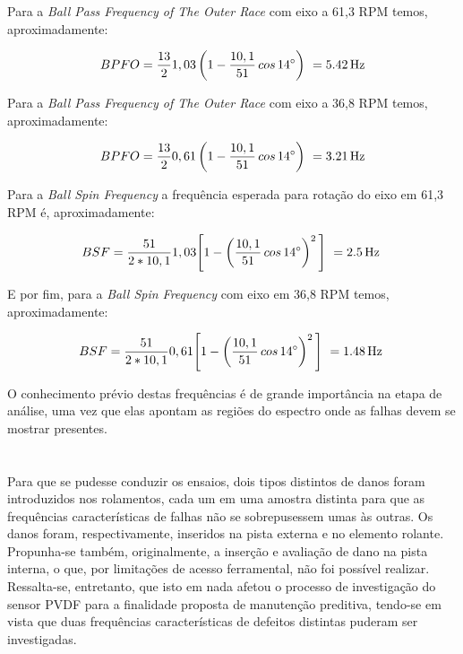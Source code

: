 \documentclass[
	12pt,				
	oneside,			
	a4paper,			
	english,			
	brazil,	
	sumario=abnt-6027-2012		
	]{abntex2ppgsi}
\begin{document}
Para a \textit{Ball Pass Frequency of The Outer Race} com eixo a 61,3 RPM temos, aproximadamente:

\begin{equation}
	BPFO = \frac{13}{2}1,03 \left ( 1 - \frac{10,1}{51} \,cos \, \ang{14} \right )  \ = \SI{5,42}{{\hertz}}
	\label{eq: BPFO no Rolamento}
\end{equation}

Para a \textit{Ball Pass Frequency of The Outer Race} com eixo a 36,8 RPM temos, aproximadamente:

\begin{equation}
	BPFO = \frac{13}{2}0,61 \left ( 1 - \frac{10,1}{51} \,cos \, \ang{14} \right )  \ = \SI{3,21}{{\hertz}}
	\label{eq: BPFO no Rolamento}
\end{equation}


Para a \textit{Ball Spin Frequency} a frequência esperada para rotação do eixo em 61,3 RPM é, aproximadamente:

\begin{equation}
	BSF = \frac{51}{2*10,1}1,03 \Bigg[  1 - \left ( \frac{10,1}{51} \,cos \, \ang{14} \right ) ^{2}  \Bigg] \ = \SI{2,5}{{\hertz}} \
	\label{eq: BSF no rolamento}
\end{equation}

E por fim, para a \textit{Ball Spin Frequency} com eixo em 36,8 RPM temos, aproximadamente:

\begin{equation}
	BSF = \frac{51}{2*10,1}0,61 \Bigg[  1 - \left ( \frac{10,1}{51} \,cos \, \ang{14} \right ) ^{2}  \Bigg] \ = \SI{1,48}{{\hertz}} \
	\label{eq: BSF no rolamento}
\end{equation}


O conhecimento prévio destas frequências é de grande importância na etapa de análise, uma vez que elas apontam as regiões do espectro onde as falhas devem se mostrar presentes.

\section{\normalfont{\textbf{Inserção dos danos nos rolamentos}}}

Para que se pudesse conduzir os ensaios, dois tipos distintos de danos foram introduzidos nos rolamentos, cada um em uma amostra distinta para que as frequências características de falhas não se sobrepusessem umas às outras. Os danos foram, respectivamente, inseridos na pista externa e no elemento rolante. Propunha-se também, originalmente, a inserção e avaliação de dano na pista interna, o que, por limitações de acesso ferramental, não foi possível realizar. Ressalta-se, entretanto, que isto em nada afetou o processo de investigação do sensor PVDF para a finalidade proposta de manutenção preditiva, tendo-se em vista que duas frequências características de defeitos distintas puderam ser investigadas.
\end{document}
